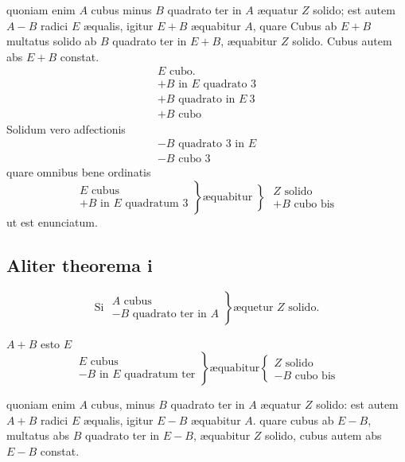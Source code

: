 \documentclass[11pt,a4paper]{article}
\begin{document}
quoniam enim $A$ cubus minus $B$ quadrato ter in $A$ æquatur $Z$ solido; est autem $A - B$ radici $E$ æqualis, igitur $E + B$ æquabitur $A$, quare Cubus ab $E + B$ multatus solido ab $B$ quadrato ter in $E + B$, æquabitur $Z$ solido. Cubus autem abs $E + B$ constat.
\[ \begin{array}{l} E \text{ cubo.} \\ + B \text{ in } E \text{ quadrato } 3 \\ + B \text{ quadrato in } E\ 3 \\ + B \text{ cubo} \end{array} \]
Solidum vero adfectionis
\[ \begin{array}{l} - B \text{ quadrato } 3 \text{ in } E \\ - B \text{ cubo } 3 \end{array} \]
quare omnibus bene ordinatis
\[ \left.\begin{array}{l} E \text{ cubus} \\ + B \text{ in } E \text{ quadratum } 3 \end{array}\right\} \text{æquabitur} \left\}\begin{array}{l} Z \text{ solido} \\ + B \text{ cubo bis} \end{array}\right. \]
ut est enunciatum.

\subsection*{Aliter theorema i}

\[ \text{Si } \left.\begin{array}{l} A \text{ cubus} \\ - B \text{ quadrato ter in } A \end{array}\right\} \text{æquetur } Z \text{ solido.} \]

$A + B$ esto $E$
\[ \left.\begin{array}{l} E \text{ cubus} \\ - B \text{ in } E \text{ quadratum ter} \end{array}\right\} \text{æquabitur} \left\{\begin{array}{l} Z \text{ solido} \\ - B \text{ cubo bis} \end{array}\right. \]

quoniam enim $A$ cubus, minus $B$ quadrato ter in $A$ æquatur $Z$ solido: est autem  $A + B$ radici $E$ æqualis, igitur $E - B$ æquabitur $A$. quare cubus ab $E - B$, multatus  abs $B$ quadrato ter in $E - B$, æquabitur $Z$ solido, cubus autem abs $E - B$ constat.
\end{document}
